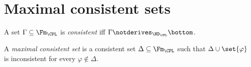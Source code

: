 \section{Maximal consistent sets}
\label{sec:prop-metatheory-02}

\begin{definition}[Consistency]
A set \(\Gamma\subseteq\Fm_{\CPL}\) is \emph{consistent} iff
\(\Gamma\notderives_{\ND_{\CPL}}\bottom\).
\end{definition}

\begin{definition}
A \emph{maximal consistent set} is a consistent set
\(\Delta\subseteq\Fm_{\CPL}\) such that
\(\Delta\cup\set{\varphi}\) is inconsistent for every
\(\varphi\notin\Delta\).
\end{definition}

